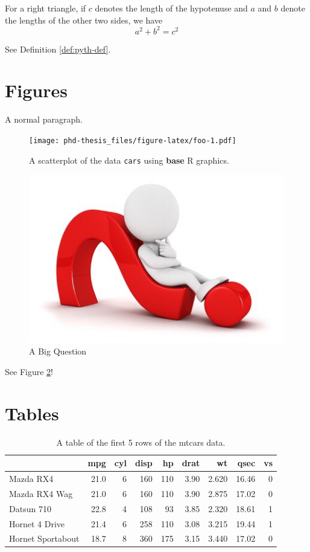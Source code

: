 \documentclass[12pt,]{book}
\theoremstyle{definition}
\theoremstyle{definition}
\theoremstyle{definition}
\theoremstyle{remark}
\let\BeginKnitrBlock\begin \let\EndKnitrBlock\end
\begin{document}
\BeginKnitrBlock{definition}[Pythagorean theorem]
\protect\hypertarget{def:pyth-def}{}{\label{def:pyth-def} {} }For a right triangle, if \(c\) denotes the length of the hypotenuse
and \(a\) and \(b\) denote the lengths of the other two sides, we have
\[a^2 + b^2 = c^2\]
\EndKnitrBlock{definition}

See Definition \ref{def:pyth-def}.

\hypertarget{figures}{%
\section{Figures}\label{figures}}

A normal paragraph.



\begin{figure}
\centering
\texttt{[image: phd-thesis\_files/figure-latex/foo-1.pdf]}
\caption{\label{fig:foo}A scatterplot of the data \texttt{cars} using \textbf{base} R graphics.}
\end{figure}

\begin{figure}

{\centering \includegraphics[width=0.45\linewidth]{img/questions} 

}

\caption{A Big Question}\label{fig:question}
\end{figure}

See Figure \ref{fig:question}!

\hypertarget{tables}{%
\section{Tables}\label{tables}}

\begin{table}[t]

\caption{\label{tab:table1}A table of the first 5 rows of the mtcars data.}
\centering
\begin{tabular}{lrrrrrrrr}
\toprule
  & mpg & cyl & disp & hp & drat & wt & qsec & vs\\
\midrule
Mazda RX4 & 21.0 & 6 & 160 & 110 & 3.90 & 2.620 & 16.46 & 0\\
Mazda RX4 Wag & 21.0 & 6 & 160 & 110 & 3.90 & 2.875 & 17.02 & 0\\
Datsun 710 & 22.8 & 4 & 108 & 93 & 3.85 & 2.320 & 18.61 & 1\\
Hornet 4 Drive & 21.4 & 6 & 258 & 110 & 3.08 & 3.215 & 19.44 & 1\\
Hornet Sportabout & 18.7 & 8 & 360 & 175 & 3.15 & 3.440 & 17.02 & 0\\
\bottomrule
\end{tabular}
\end{table}
\end{document}
